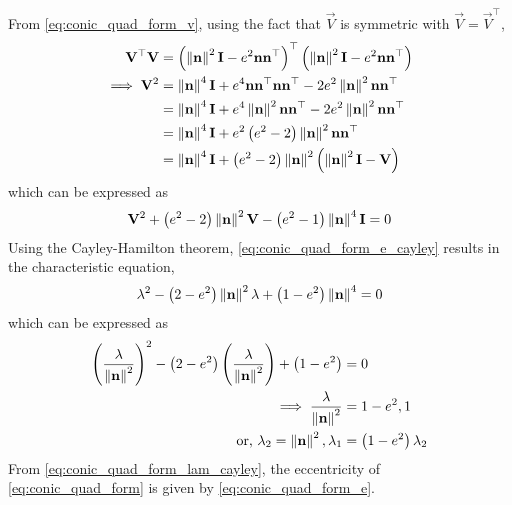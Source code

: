 \documentclass[journal,12pt,onecolumn]{IEEEtran}
\renewcommand\thesection{\arabic{section}}
\begin{document}
\begin{enumerate}[label=\thesection.\arabic*.,ref=\thesection.\theenumi]
   \section{}
	\label{app:conic-parameters}
	From \eqref{eq:conic_quad_form_v}, using the fact that $\vec{V}$ is symmetric with $\vec{V} = \vec{V}^{\top}$,
  \begin{align}
	  \mathbf{V}^{\top} \mathbf{V}&=\left(\left\lVert\mathbf{n}\right\rVert^2\mathbf{I}-e^2\mathbf{n}\mathbf{n}^{\top}\right)^{\top}
	  \left(\left\lVert\mathbf{n}\right\rVert^2\mathbf{I}-e^2\mathbf{n}\mathbf{n}^{\top}\right)
    \\
	  \implies \mathbf{V}^{2} &= \left\lVert\mathbf{n}\right\rVert^4\mathbf{I}+e^4\mathbf{n}\mathbf{n}^{\top}\mathbf{n}\mathbf{n}^{\top}
	  -2e^2\left\lVert\mathbf{n}\right\rVert^2\mathbf{n}\mathbf{n}^{\top}
    \\
	  &= \left\lVert\mathbf{n}\right\rVert^4\mathbf{I} + e^4\left\lVert\mathbf{n}\right\rVert^2\mathbf{n}\mathbf{n}^{\top}
	  - 2e^2\left\lVert\mathbf{n}\right\rVert^2\mathbf{n}\mathbf{n}^{\top}
    \\
	  &= \left\lVert\mathbf{n}\right\rVert^4\mathbf{I} + e^2\left(e^2 - 2\right)\left\lVert\mathbf{n}\right\rVert^2\mathbf{n}\mathbf{n}^{\top}
    \\
	  &= \left\lVert\mathbf{n}\right\rVert^4\mathbf{I} + \left(e^2 - 2\right)\left\lVert\mathbf{n}\right\rVert^2\left(\left\lVert\mathbf{n}\right\rVert^2\mathbf{I}- \mathbf{V}\right)
    \end{align}
%    
which can be expressed as
\begin{align}
  \mathbf{V}^{2} + \left(e^2 - 2\right)\left\lVert\mathbf{n}\right\rVert^2\mathbf{V} - \left(e^2 - 1\right)\left\lVert\mathbf{n}\right\rVert^4\mathbf{I}=0
  \label{eq:conic_quad_form_e_cayley}
\end{align}
	Using the Cayley-Hamilton theorem,
	\eqref{eq:conic_quad_form_e_cayley} results in the characteristic equation, 
\begin{align}
  \lambda^{2} - \left(2-e^2\right)\left\lVert\mathbf{n}\right\rVert^2\lambda + \left(1-e^2 \right)\left\lVert\mathbf{n}\right\rVert^4=0
\end{align}
which can be expressed as
\begin{align}
\left(\frac{\lambda}{\left\lVert\mathbf{n}\right\rVert^2}\right)^2 - \left(2-e^2 \right)\left(\frac{\lambda}{\left\lVert\mathbf{n}\right\rVert^2}\right) 
	+ \left(1-e^2 \right) &= 0
	\\
	\implies \frac{\lambda}{\left\lVert\mathbf{n}\right\rVert^2} &= 1-e^2, 1
  \\
	\text{or, }\lambda_2 = \left\lVert\mathbf{n}\right\rVert^2, \lambda_1 &= \left(1-e^2\right)\lambda_2 
  \label{eq:conic_quad_form_lam_cayley}
\end{align}
From   \eqref{eq:conic_quad_form_lam_cayley}, the eccentricity of \eqref{eq:conic_quad_form} is given by 
\eqref{eq:conic_quad_form_e}.   
%

\end{enumerate}
\end{document}
